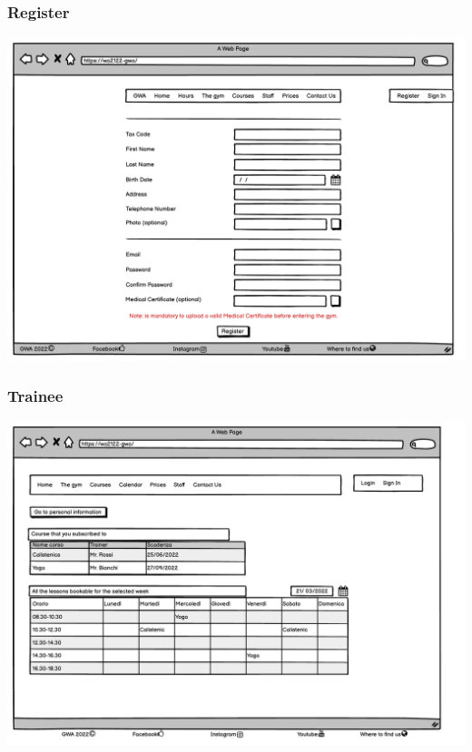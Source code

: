 \subsubsection{Register}
\includegraphics[width=\columnwidth]{InterfaceMockup/register.pdf}

\subsubsection{Trainee}
\includegraphics[width=\columnwidth]{InterfaceMockup/Trainee.pdf}

